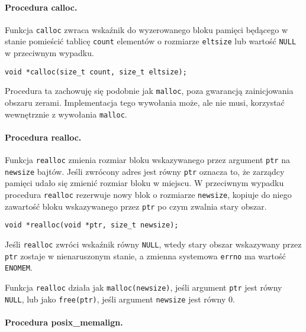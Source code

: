 \documentclass[12pt,a4paper,titlepage,twoside]{mwart}
\begin{document}
\paragraph{Procedura calloc.}

Funkcja \texttt{calloc} zwraca wskaźnik do wyzerowanego bloku pamięci będącego
w stanie pomieścić tablicę \texttt{count} elementów o rozmiarze
\texttt{eltsize} lub wartość \texttt{NULL} w przeciwnym wypadku.

\vspace{2ex}
\begin{lstlisting}[caption={Prototyp procedury \texttt{calloc}.}]
void *calloc(size_t count, size_t eltsize);
\end{lstlisting}

Procedura ta zachowuję się podobnie jak \texttt{malloc}, poza gwarancją
zainicjowania obszaru zerami. Implementacja tego wywołania może, ale nie musi,
korzystać wewnętrznie z wywołania \texttt{malloc}.

\paragraph{Procedura realloc.}

Funkcja \texttt{realloc} zmienia rozmiar bloku wskazywanego przez argument
\texttt{ptr} na \texttt{newsize} bajtów. Jeśli zwrócony adres jest równy
\texttt{ptr} oznacza to, że zarządcy pamięci udało się zmienić rozmiar bloku w
miejscu. W przeciwnym wypadku procedura \texttt{realloc} rezerwuje nowy blok o
rozmiarze \texttt{newsize}, kopiuje do niego zawartość bloku wskazywanego przez
\texttt{ptr} po czym zwalnia stary obszar.

\vspace{2ex}
\begin{lstlisting}[caption={Prototyp procedury \texttt{realloc}.}]
void *realloc(void *ptr, size_t newsize);
\end{lstlisting}

Jeśli \texttt{realloc} zwróci wskaźnik równy \texttt{NULL}, wtedy stary obszar
wskazywany przez \texttt{ptr} zostaje w nienaruszonym stanie, a zmienna
systemowa \texttt{errno} ma wartość \texttt{ENOMEM}.

Funkcja \texttt{realloc} działa jak \texttt{malloc(newsize)}, jeśli argument
\texttt{ptr} jest równy \texttt{NULL}, lub jako \texttt{free(ptr)}, jeśli
argument \texttt{newsize} jest równy $0$.

\paragraph{Procedura posix\_memalign.}
\end{document}
